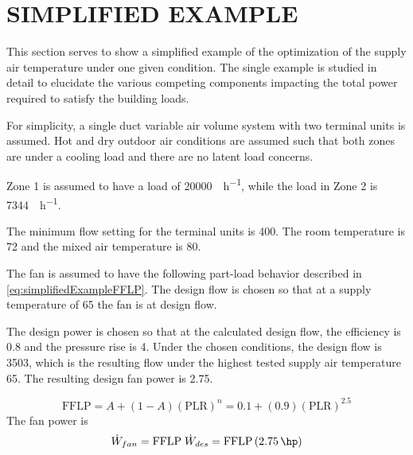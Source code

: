 \chapter{\texorpdfstring{\MakeUppercase{Simplified Example}}{Simplified Example}}

This section serves to show a simplified example of the optimization of
the supply air temperature under one given condition. The single example
is studied in detail to elucidate the various competing
components impacting the total power required to satisfy the building
loads. 

For simplicity, a single duct variable air volume system with two
terminal units is assumed. Hot and dry outdoor air conditions are
assumed such that both zones are under a cooling load and there are no
latent load concerns.  

Zone 1 is assumed to have a load of \SI{20000}{\btu\per\hour}, while the
load in Zone 2 is \SI{7344}{\btu\per\hour}. 

The minimum flow setting for the terminal units is \SI{400}{\cfm}. The
room temperature is \SI{72}{\degreeF} and the mixed air temperature is
\SI{80}{\degreeF}.

The fan is assumed to have the following part-load behavior described in
 \ref{eq:simplifiedExampleFFLP}. The design
flow is chosen so that at a supply temperature of \SI{65}{\degreeF} the
fan is at design flow. 

The design power is chosen so that at the calculated design flow, the
efficiency is \num{0.8} and the pressure rise is \SI{4}{\inchwater}.
Under the chosen conditions, the design flow is \SI{3503}{\cfm}, which
is the resulting flow under the highest tested supply air temperature
\SI{65}{\degreeF}. The resulting design fan power is \SI{2.75}{\hp}. 

\begin{equation}\label{eq:simplifiedExampleFFLP}
    \text{FFLP} = A + \left(1-A\right)(\text{PLR})^{n} =   0.1 + (0.9)(\text{PLR})^{2.5}
\end{equation}
The fan power is 
\begin{equation}
    \dot{W}_{fan} = \text{FFLP} \; \dot{W}_{des} = \text{FFLP}\left(\SI{2.75}{\hp}\right) 
\end{equation}

